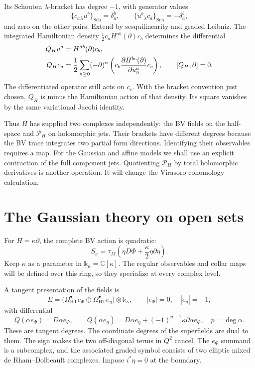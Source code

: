 Its Schouten \(\lambda\)-bracket has degree \(-1\), with generator
values
\[
 \{c_a{}_\lambda u^b\}_{\mathrm{Sch}}=\delta_a^b,
 \qquad \{u^b{}_\lambda c_a\}_{\mathrm{Sch}}=-\delta_a^b,
\]
and zero on the other pairs. Extend by sesquilinearity and graded
Leibniz. The integrated Hamiltonian density
\(\tfrac12c_aH^{ab}(\partial)c_b\) determines the differential
\begin{align}\label{pcsm:cotangent-differential}
 Q_Hu^a&=H^{ab}(\partial)c_b,\notag\\
 Q_Hc_a&=\frac12\sum_{n\geq0}(-\partial)^n
   \left(c_b\frac{\partial H^{bc}(\partial)}{\partial u^a_n}c_c\right),
 \qquad [Q_H,\partial]=0.
\end{align}
The differentiated operator still acts on \(c_c\).
With the bracket convention just chosen, \(Q_H\) is minus the
Hamiltonian action of that density. Its square vanishes by the
same variational Jacobi identity.

Thus \(H\) has supplied two complexes independently: the BV fields
on the half-space and \(\mathcal P_H\) on holomorphic jets.
Their brackets have different degrees because the BV trace integrates
two partial form directions. Identifying their observables requires
a map. For the Gaussian and affine models we shall use an explicit
contraction of the full component jets.
Quotienting \(\mathcal P_H\) by total holomorphic derivatives is
another operation. It will change the Virasoro cohomology calculation.

\section{The Gaussian theory on open sets}

For \(H=\kappa\partial\), the complete BV action is quadratic:
\begin{equation}\label{pcsm:freeaction}
 S_\kappa=\tau_M\left(\eta D\Phi+\frac\kappa2\eta\partial\eta\right).
\end{equation}
Keep \(\kappa\) as a parameter in
\(\mathbb k_\kappa=\mathbb C[\kappa]\).
The regular observables and collar maps will be defined over this ring,
so they specialize at every complex level.

A\label{pcsm:def:parameter-field-complex} tangent presentation of the fields is
\[
 E=\bigl(\Omega_{\mathrm{HT}}^\bullet e_\Phi
          \oplus\Omega_{\mathrm{HT}}^\bullet e_\eta\bigr)
             \otimes\mathbb k_\kappa,
 \qquad |e_\Phi|=0,\quad |e_\eta|=-1,
\]
with differential
\[
 Q(\alpha e_\Phi)=D\alpha e_\Phi,\qquad
 Q(\alpha e_\eta)=D\alpha e_\eta
             +(-1)^{p+1}\kappa\partial\alpha e_\Phi,
 \quad p=\deg\alpha.
\]
These are tangent degrees. The coordinate degrees of the superfields
are dual to them. The sign makes the two off-diagonal terms in
\(Q^2\) cancel. The \(e_\Phi\) summand is a subcomplex, and the
associated graded symbol consists of two elliptic mixed
de Rham--Dolbeault complexes. Impose \(i^*\eta=0\) at the boundary.

